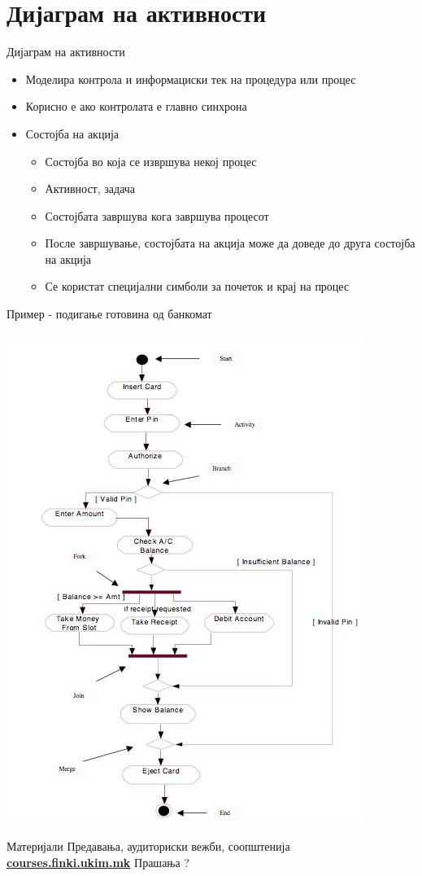 \section{Дијаграм на активности}

\begin{frame}{Дијаграм на активности}
\begin{itemize}
  \item Моделира контрола и информациски тек на процедура или процес
  \item Корисно е ако контролата е главно синхрона
  \item Состојба на акција
\begin{itemize}
  \item Состојба во која се извршува некој процес
  \item Активност, задача
  \item Состојбата завршува кога завршува процесот
  \item После завршување, состојбата на акција може да доведе до друга состојба на акција
  \item Се користат специјални симболи за почеток и крај на процес
\end{itemize}
\end{itemize}
\end{frame}

\begin{frame}{Пример - подигање готовина од банкомат}
\begin{center}
    \includegraphics[scale=0.35]{images/activity.jpg}
\end{center}
\end{frame}

\begin{frame}{Материјали}{}
	Предавања, аудиториски вежби, соопштенија\\
	\href{http://courses.finki.ukim.mk/}{\textbf{courses.finki.ukim.mk}}
	\vfill
	{\Huge Прашања ?}
\end{frame}


